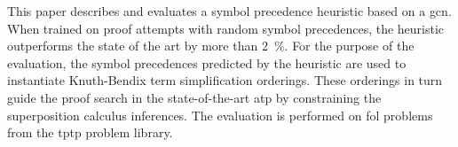 

This paper describes and evaluates a symbol precedence heuristic based on a \acrlong{gcn}.
When trained on proof attempts with random symbol precedences,
the heuristic outperforms the state of the art by more than \SI{2}{\percent}.
For the purpose of the evaluation, the symbol precedences predicted by the heuristic
are used to instantiate Knuth-Bendix term simplification orderings.
These orderings in turn guide the proof search in the state-of-the-art \acrlong{atp} \vampire{}
by constraining the superposition calculus inferences.
The evaluation is performed on \acrlong{fol} problems from the \acrshort{tptp} problem library.


